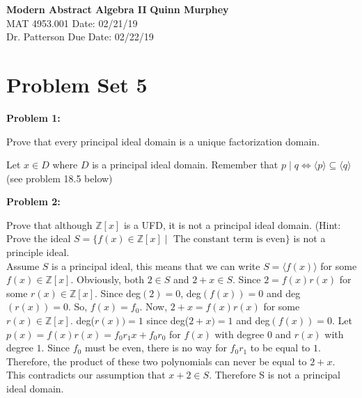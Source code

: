 \documentclass[letter paper, 12pt]{article}
\begin{document}
\noindent
\large\textbf{Modern Abstract Algebra II} \hfill \textbf{Quinn Murphey} \\
\normalsize MAT 4953.001 \hfill Date: 02/21/19 \\
Dr. Patterson \hfill Due Date: 02/22/19 \\
\noindent\makebox[\linewidth]{\rule{\paperwidth}{0.4pt}}

\section*{Problem Set 5}
\doublespacing
\noindent\textbf{Problem 1:}
    
    Prove that every principal ideal domain is a unique factorization domain.
    
    Let $x\in D$ where $D$ is a principal ideal domain. Remember that $p\mid q \Leftrightarrow \langle p\rangle \subseteq \langle q\rangle$ (see problem 18.5 below)
    
    
    
%    
    
\noindent\textbf{Problem 2:}
    
    Prove that although $\mathbb{Z}[x]$ is a UFD, it is not a principal ideal domain. (Hint: Prove the ideal $S=\{f(x)\in\mathbb{Z}[x] \mid\text{ The constant term is even}\}$ is not a principle ideal.\\
    
    Assume $S$ is a principal ideal, this means that we can write $S = \langle f(x)\rangle$ for some $f(x)\in\mathbb{Z}[x]$. Obviously, both $2\in S$ and $2+x \in S$. Since $2=f(x)r(x)$ for some $r(x)\in\mathbb{Z}[x]$. Since deg$(2)=0$, deg$(f(x))=0$ and deg$(r(x))=0$. So, $f(x) = f_0$. Now, $2+x=f(x)r(x)$ for some $r(x)\in\mathbb{Z}[x]$. deg($r(x))=1$ since deg($2+x)=1$ and deg$(f(x))=0$. Let $p(x)=f(x)r(x)=f_0r_1x + f_0r_0$ for $f(x)$ with degree $0$ and $r(x)$ with degree $1$. Since $f_0$ must be even, there is no way for $f_0r_1$ to be equal to $1$. Therefore, the product of these two polynomials can never be equal to $2+x$. This contradicts our assumption that $x+2\in S$. Therefore S is not a principal ideal domain.
    
\end{document}

